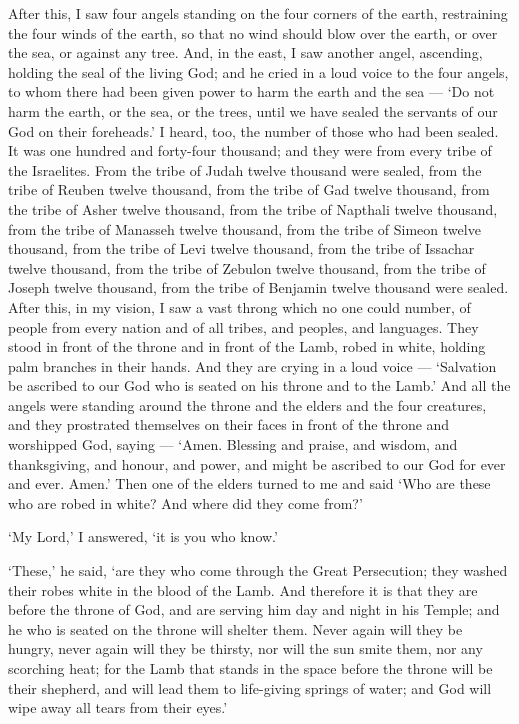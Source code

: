  After this, I saw four angels standing on the four corners
of the earth, restraining the four winds of the earth, so that no wind
should blow over the earth, or over the sea, or against any tree.
 And, in the east, I saw another angel, ascending, holding
the seal of the living God; and he cried in a loud voice to the four
angels, to whom there had been given power to harm the earth and the sea
---  `Do not harm the earth, or the sea, or the trees, until
we have sealed the servants of our God on their foreheads.' 
I heard, too, the number of those who had been sealed. It was one
hundred and forty-four thousand; and they were from every tribe of the
Israelites.  From the tribe of Judah twelve thousand were
sealed, from the tribe of Reuben twelve thousand, from the tribe of Gad
twelve thousand,  from the tribe of Asher twelve thousand,
from the tribe of Napthali twelve thousand, from the tribe of Manasseh
twelve thousand,  from the tribe of Simeon twelve thousand,
from the tribe of Levi twelve thousand, from the tribe of Issachar
twelve thousand,  from the tribe of Zebulon twelve thousand,
from the tribe of Joseph twelve thousand, from the tribe of Benjamin
twelve thousand were sealed.  After this, in my vision, I
saw a vast throng which no one could number, of people from every nation
and of all tribes, and peoples, and languages. They stood in front of
the throne and in front of the Lamb, robed in white, holding palm
branches in their hands.  And they are crying in a loud
voice --- `Salvation be ascribed to our God who is seated on his throne
and to the Lamb.'  And all the angels were standing around
the throne and the elders and the four creatures, and they prostrated
themselves on their faces in front of the throne and worshipped God,
 saying --- `Amen. Blessing and praise, and wisdom, and
thanksgiving, and honour, and power, and might be ascribed to our God
for ever and ever. Amen.'  Then one of the elders turned to
me and said `Who are these who are robed in white? And where did they
come from?'

 `My Lord,' I answered, `it is you who know.'

`These,' he said, `are they who come through the Great Persecution; they
washed their robes white in the blood of the Lamb.  And
therefore it is that they are before the throne of God, and are serving
him day and night in his Temple; and he who is seated on the throne will
shelter them.  Never again will they be hungry, never again
will they be thirsty, nor will the sun smite them, nor any scorching
heat;  for the Lamb that stands in the space before the
throne will be their shepherd, and will lead them to life-giving springs
of water; and God will wipe away all tears from their eyes.'

